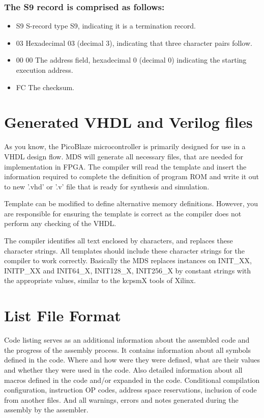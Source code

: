    \subsubsection{The S9 record is comprised as follows:}
        \begin{itemize}
            \item S9 S-record type S9, indicating it is a termination record.
            \item 03 Hexadecimal 03 (decimal 3), indicating that three character pairs follow.
            \item 00 00 The address field, hexadecimal 0 (decimal 0) indicating the starting execution address.
            \item FC The checksum.
        \end{itemize}

\section{Generated VHDL and Verilog files}
    As you know, the PicoBlaze microcontroller is primarily designed for use in a VHDL design flow. MDS will generate all necessary files, that are needed for implementation in FPGA. The compiler will read the template and insert the information required to complete the definition of program ROM and write it out to new '.vhd' or '.v' file that is ready for synthesis and simulation.

    Template can be modified to define alternative memory definitions. However, you are responsible for ensuring the template is correct as the compiler does not perform any checking of the VHDL.

    The compiler identifies all text enclosed by {} characters, and replaces these character strings. All templates should include these {} character strings for the compiler to work correctly. Basically the MDS replaces instances on {INIT\_XX}, {INITP\_XX} and {INIT64\_X}, {INIT128\_X}, {INIT256\_X} by constant strings with the appropriate values, similar to the kcpsmX tools of Xilinx.

\section{List File Format}
    Code listing serves as an additional information about the assembled code and the progress of the assembly process. It contains information about all symbols defined in the code. Where and how were they were defined, what are their values and whether they were used in the code. Also detailed information about all macros defined in the code and/or expanded in the code. Conditional compilation configuration, instruction OP codes, address space reservations, inclusion of code from another files. And all warnings, errors and notes generated during the assembly by the assembler.

